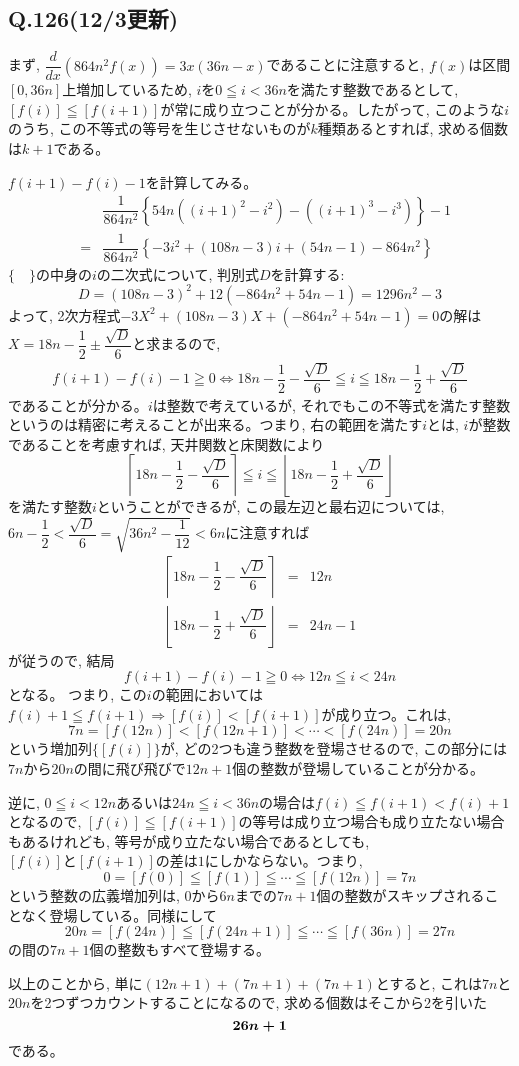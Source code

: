 \documentclass[twocolumn]{jbook}
\theoremstyle{definition}
\newcommand{\bolm}[1]{{\mbox{\boldmath $#1$}}}
\newcommand{\dou}{\Leftrightarrow}
\newcommand{\beqn}{\begin{eqnarray*}}
\newcommand{\eeqn}{\end{eqnarray*}}
\newcommand{\nara}{\Rightarrow}
\renewcommand{\leq}{\leqq}
\renewcommand{\geq}{\geqq}
\begin{document}
\subsection*{Q.126(12/3更新)}
まず, $\dfrac{d}{dx}(864n^2f(x)) = 3x(36n - x)$であることに注意すると, $f(x)$は区間$[0,36n]$上増加しているため, $i$を$0\leq i <36n$を満たす整数であるとして, $[f(i)] \leq [f(i+1)]$が常に成り立つことが分かる。したがって, このような$i$のうち, この不等式の等号を生じさせないものが$k$種類あるとすれば, 求める個数は$k+1$である。\par
$f(i+1) - f(i)-1$を計算してみる。
\beqn
&&\dfrac{1}{864n^2}\left\{ 54n((i+1)^2 - i^2)  - ((i+1)^3 - i^3)\right\}-1\\
&=& \dfrac{1}{864n^2}\left\{ -3i^2 + (108n -3)i + (54n-1)-864n^2 \right\}
\eeqn
$\{\quad \}$の中身の$i$の二次式について, 判別式$D$を計算する:
\[D=(108n-3)^2 +12(-864n^2 + 54n-1) =1296n^2 - 3\]
よって, 2次方程式$-3X^2 + (108n-3)X + (-864n^2 + 54n -1) = 0$の解は$X=18n-\dfrac{1}{2} \pm \dfrac{\sqrt{D}}{6}$と求まるので,
\beqn
f(i+1) - f(i) -1 \geq 0 \dou 18n-\dfrac{1}{2} -\dfrac{\sqrt{D}}{6} \leq i \leq 18n-\dfrac{1}{2} +\dfrac{\sqrt{D}}{6}
\eeqn
であることが分かる。$i$は整数で考えているが, それでもこの不等式を満たす整数というのは精密に考えることが出来る。つまり, 右の範囲を満たす$i$とは, $i$が整数であることを考慮すれば, 天井関数と床関数により
\[\left\lceil 18n-\dfrac{1}{2} -\dfrac{\sqrt{D}}{6}\right\rceil \leq i \leq \left\lfloor 18n-\dfrac{1}{2} + \dfrac{\sqrt{D}}{6} \right\rfloor\]
を満たす整数$i$ということができるが, この最左辺と最右辺については, $6n-\dfrac{1}{2} <  \dfrac{\sqrt{D}}{6} = \sqrt{36n^2 - \dfrac{1}{12}} < 6n$に注意すれば
\beqn
\left\lceil 18n-\dfrac{1}{2} -\dfrac{\sqrt{D}}{6}\right\rceil &=& 12n\\
\left\lfloor 18n-\dfrac{1}{2} + \dfrac{\sqrt{D}}{6} \right\rfloor&=& 24n-1
\eeqn
が従うので, 結局
\[f(i+1) - f(i) -1\geq 0 \dou 12n \leq i < 24n\]
となる。
つまり, この$i$の範囲においては $f(i) + 1 \leq f(i+1) \nara \left[ f(i)\right] < \left[ f(i+1) \right]$が成り立つ。これは, 
\[ 7n=[f(12n)] < [f(12n+1)] < \cdots < [f(24n)]=20n\]
という増加列$\{ [f(i)] \}$が, どの2つも違う整数を登場させるので, この部分には$7n$から$20n$の間に飛び飛びで$12n+1$個の整数が登場していることが分かる。
\par
逆に, $0\leq i<12n$あるいは$24n\leq i <36n$の場合は$f(i) \leq f(i+1) < f(i) +1$となるので, $[f(i)] \leq [f(i+1)]$の等号は成り立つ場合も成り立たない場合もあるけれども, 等号が成り立たない場合であるとしても, \bolm{ [f(i)] と [f(i+1)] の差は1にしかならない。}つまり, 
\[0=[f(0)] \leq [f(1)] \leq \cdots \leq [f(12n)] = 7n\]
という整数の広義増加列は, $0$から$6n$までの$7n+1$個の整数がスキップされることなく登場している。同様にして
\[20n=[f(24n)] \leq [f(24n+1)] \leq\cdots \leq [f(36n)] = 27n\]
の間の$7n+1$個の整数もすべて登場する。\par
以上のことから, 単に$(12n+1) + (7n+1) + (7n+1)$とすると, これは$7n$と$20n$を2つずつカウントすることになるので, 求める個数はそこから2を引いた
\[ \bolm{26n+1} \]
である。
\clearpage
\end{document}
